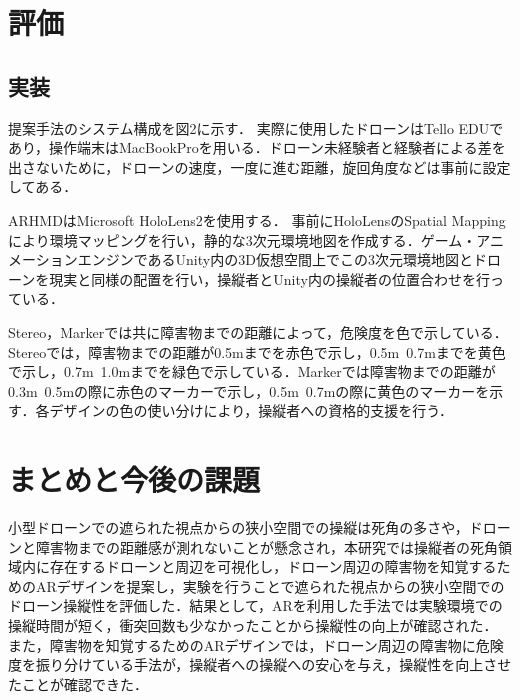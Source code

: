 \documentclass[a4paper,10pt,twocolumn,uplatex]{jsarticle}
\begin{document}
\section{評価}\label{experiment}
\subsection{実装}
提案手法のシステム構成を図2に示す．
実際に使用したドローンはTello EDUであり，操作端末はMacBookProを用いる．ドローン未経験者と経験者による差を出さないために，ドローンの速度，一度に進む距離，旋回角度などは事前に設定してある．
\par
ARHMDはMicrosoft HoloLens2を使用する．
事前にHoloLensのSpatial Mappingにより環境マッピングを行い，静的な3次元環境地図を作成する．ゲーム・アニメーションエンジンであるUnity内の3D仮想空間上でこの3次元環境地図とドローンを現実と同様の配置を行い，操縦者とUnity内の操縦者の位置合わせを行っている．
\par
Stereo，Markerでは共に障害物までの距離によって，危険度を色で示している．Stereoでは，障害物までの距離が0.5mまでを赤色で示し，0.5m~0.7mまでを黄色で示し，0.7m~1.0mまでを緑色で示している．Markerでは障害物までの距離が0.3m~0.5mの際に赤色のマーカーで示し，0.5m~0.7mの際に黄色のマーカーを示す．各デザインの色の使い分けにより，操縦者への資格的支援を行う．

\section{まとめと今後の課題}
小型ドローンでの遮られた視点からの狭小空間での操縦は死角の多さや，ドローンと障害物までの距離感が測れないことが懸念され，本研究では操縦者の死角領域内に存在するドローンと周辺を可視化し，ドローン周辺の障害物を知覚するためのARデザインを提案し，実験を行うことで遮られた視点からの狭小空間でのドローン操縦性を評価した．結果として，ARを利用した手法では実験環境での操縦時間が短く，衝突回数も少なかったことから操縦性の向上が確認された．
また，障害物を知覚するためのARデザインでは，ドローン周辺の障害物に危険度を振り分けている手法が，操縦者への操縦への安心を与え，操縦性を向上させたことが確認できた．



\end{document}
